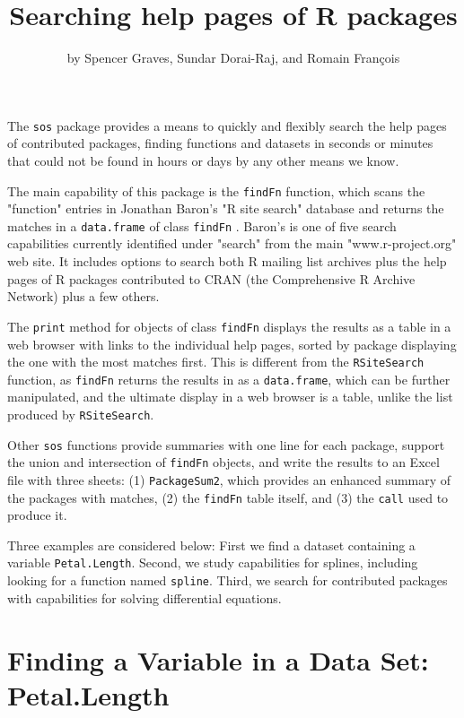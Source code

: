\title{Searching help pages of R packages}
\author{by Spencer Graves, Sundar Dorai-Raj, and Romain Fran{\c c}ois}

\maketitle

The {\tt sos} package provides a means to quickly and flexibly
search the help pages of contributed packages, finding
functions and datasets in seconds or minutes that could not be
found in hours or days by any other means we know.

The main capability of this package is the {\tt findFn} function,
which scans the "function" entries in Jonathan Baron's "R site search"
database and returns the matches in a {\tt data.frame} of class
{\tt findFn} \citep{JB09URL}.  Baron's is one of five
search capabilities currently identified under "search" from the
main "www.r-project.org" web site.  It includes options to
search both R mailing list archives plus the help pages of
R packages contributed to CRAN (the Comprehensive R Archive
Network) plus a few others.

The {\tt print} method for objects of class {\tt findFn}
displays the results as a table in a web
browser with links to the individual help pages, sorted by package
displaying the one with the most matches first.  This is different
from the {\tt RSiteSearch} function, as {\tt findFn} returns
the results in \R{} as a {\tt data.frame}, which can be further
manipulated, and the ultimate display in a web browser is a
table, unlike the list produced by {\tt RSiteSearch}.

Other {\tt sos} functions provide summaries with one line for each
package, support the union and intersection of {\tt findFn} objects,
and write the results to an Excel file with three sheets:  (1)
{\tt PackageSum2}, which provides an enhanced summary of the packages
with matches, (2) the {\tt findFn} table itself, and (3) the {\tt call}
used to produce it.

Three examples are considered below:  First we find a dataset
containing a variable {\tt Petal.Length}. Second, we study
\R{} capabilities for splines, including looking for a function 
named {\tt spline}.  Third, we search for contributed \R{} packages
 with capabilities for solving differential equations.

\section*{Finding a Variable in a Data Set:  Petal.Length}

